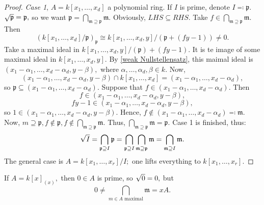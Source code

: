 \begin{proof}
  \emph{Case 1}, \(A = k[x_1, \dotsc, x_d]\) a polynomial ring.
  If \(I\) is prime, denote \(I \eqqcolon \mathfrak p.\) \(\sqrt{\mathfrak p} = \mathfrak p,\) so we want
  \(\mathfrak p = \bigcap_{\mathfrak m \supseteq \mathfrak p} \mathfrak m.\)
  Obviously, \(LHS \subseteq RHS.\)
  Take
  \(f \in \bigcap_{\mathfrak m \supseteq \mathfrak p} \mathfrak m.\) Then
  \[(k[x_1, \dotsc, x_d]/{\mathfrak p})_{\mathfrak p} \cong k[x_1, \dotsc, x_d, y]/{(\mathfrak p + (fy-1))} \neq 0.\]
  Take a maximal ideal in
  \(k[x_1, \dotsc, x_d, y]/{(\mathfrak p) + (fy-1)}.\)
  It is te image of some maximal ideal in
  \(k[x_1, \dotsc, x_d, y].\)
  By \cref{weak Nullstellensatz}, this maimal ideal is
  \((x_1 - \alpha_1, \dotsc, x_d - \alpha_d, y - \beta),\)
  where
  \(\alpha, \dotsc, \alpha_d, \beta \in k.\)
  Now,
  \[(x_1 - \alpha_1, \dotsc, x_d - \alpha_d, y - \beta) \cap k[x_1, \dotsc, x_d] = (x_1 - \alpha_1, \dotsc, x_d - \alpha_d),\]
  so \(\mathfrak p \subseteq (x_1 - \alpha_1, \dotsc, x_d - \alpha_d).\)
  Suppose that
  \(f \in (x_1 - \alpha_1, \dotsc, x_d - \alpha_d).\)
  Then
  \[f \in (x_1 - \alpha_1, \dotsc, x_d - \alpha_d, y-\beta),\]
  \[fy-1 \in (x_1 - \alpha_1, \dotsc, x_d - \alpha_d, y - \beta),\]
  so \(1 \in (x_1 - \alpha_1, \dotsc, x_d - \alpha_d, y - \beta).\)
  Hence,
  \(f \notin (x_1 - \alpha_1, \dotsc, x_d - \alpha_d) \eqqcolon \mathfrak m.\)
  Now,
  \(m \supseteq \mathfrak p, f \notin \mathfrak p, f \notin \bigcap_{\mathfrak m \supseteq \mathfrak p} \mathfrak m.\)
  Thus,
  \(\bigcap_{\mathfrak m \supseteq \mathfrak p} \mathfrak m = \mathfrak p.\)
  Case 1 is finished, thus:
  \[\sqrt{I} = \bigcap_{\mathfrak p \supseteq I} \mathfrak p = \bigcap_{\mathfrak p \supseteq I} \bigcap_{\mathfrak m \supseteq \mathfrak p} \mathfrak m = \bigcap_{\mathfrak m \supseteq I} \mathfrak m.\]
  The general case is
  \(A = k[x_1, \dotsc, x_r]/{I};\) one lifts everything to \(k[x_1, \dotsc, x_r].\)
\end{proof}

\begin{example}
  If \(A = k[x]_{(x)},\) then \(0 \in A\) is prime, so \(\sqrt{0} = 0,\) but \[0 \neq \bigcap_{m \in A \text{ maximal}} \mathfrak m = x A.\]
\end{example}




